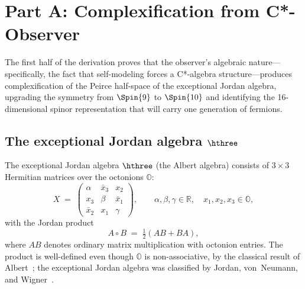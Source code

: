 
\section{Part A: Complexification from C*-Observer}\label{sec:complexification}

The first half of the derivation proves that the observer's algebraic
nature---specifically, the fact that self-modeling forces a C*-algebra
structure---produces complexification of the Peirce half-space of the
exceptional Jordan algebra, upgrading the symmetry from
$\Spin{9}$ to $\Spin{10}$ and identifying the 16-dimensional
spinor representation that will carry one generation of fermions.

\subsection{The exceptional Jordan algebra \texorpdfstring{$\hthree$}{h3(O)}}\label{sec:h3O}

The exceptional Jordan algebra $\hthree$ (the Albert algebra)
consists of $3\times 3$ Hermitian matrices over the octonions $\mathbb{O}$:
\begin{equation}\label{eq:h3O-element}
  X \;=\;
  \begin{pmatrix}
    \alpha & \bar{x}_3 & x_2 \\[3pt]
    x_3 & \beta & \bar{x}_1 \\[3pt]
    \bar{x}_2 & x_1 & \gamma
  \end{pmatrix},
  \qquad
  \alpha,\beta,\gamma \in \mathbb{R},
  \quad
  x_1,x_2,x_3 \in \mathbb{O},
\end{equation}
with the Jordan product
\begin{equation}\label{eq:jordan-product}
  A \circ B \;=\; \tfrac{1}{2}(AB + BA),
\end{equation}
where $AB$ denotes ordinary matrix multiplication with octonion entries.
The product is well-defined even though $\mathbb{O}$ is non-associative,
by the classical result of Albert~\cite{Albert1934}; the exceptional
Jordan algebra was classified by Jordan, von~Neumann, and
Wigner~\cite{JvNW1934}.

